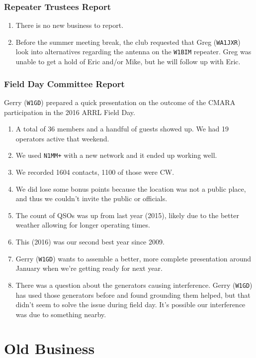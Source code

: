 \documentclass[10pt,letterpaper]{article}
\begin{document}
\subsubsection{Repeater Trustees Report}

\begin{enumerate}
\item There is no new business to report.
\item Before the summer meeting break, the club requested that Greg (\texttt{WA1JXR}) look into alternatives regarding the antenna on the \texttt{W1BIM} repeater. Greg was unable to get a hold of Eric and/or Mike, but he will follow up with Eric.
\end{enumerate}

\subsubsection{Field Day Committee Report}
Gerry (\texttt{W1GD}) prepared a quick presentation on the outcome of the CMARA participation in the 2016 ARRL Field Day.

\begin{enumerate}
\item A total of 36 members and a handful of guests showed up. We had 19 operators active that weekend.
\item We used \texttt{N1MM+} with a new network and it ended up working well.
\item We recorded 1604 contacts, 1100 of those were CW.
\item We did lose some bonus points because the location was not a public place, and thus we couldn't invite the public or officials.
\item The count of QSOs was up from last year (2015), likely due to the better weather allowing for longer operating times.
\item This (2016) was our second best year since 2009.
\item Gerry (\texttt{W1GD}) wants to assemble a better, more complete presentation around January when we're getting ready for next year.
\item There was a question about the generators causing interference. Gerry (\texttt{W1GD}) has used those generators before and found grounding them helped, but that didn't seem to solve the issue during field day. It's possible our interference was due to something nearby.
\end{enumerate}

\section{Old Business}
\end{document}
